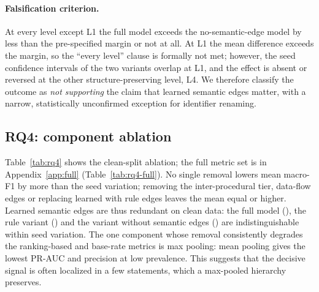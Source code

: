 \documentclass[pdflatex,sn-mathphys-num]{sn-jnl}
\begin{document}
\paragraph{Falsification criterion.} At every level except L1 the full model
exceeds the no-semantic-edge model by less than the pre-specified margin or not
at all. At L1 the mean difference exceeds the margin, so the ``every level''
clause is formally not met; however, the seed confidence intervals of the two
variants overlap at L1, and the effect is absent or reversed at the other
structure-preserving level, L4. We therefore classify the outcome as
\emph{not supporting} the claim that learned semantic edges matter, with a
narrow, statistically unconfirmed exception for identifier renaming.

\subsection{RQ4: component ablation}\label{sec:r-rq4}
Table~\ref{tab:rq4} shows the clean-split ablation; the full metric set is in
Appendix~\ref{app:full} (Table~\ref{tab:rq4-full}). No single removal lowers
mean macro-F1 by more than the seed variation; removing the inter-procedural
tier, data-flow edges or replacing learned with rule edges leaves the mean
equal or higher. Learned semantic edges are thus redundant on clean data: the
full model (\RqFourFullTestFOneMacro), the rule variant
(\RqFourRuleESemTestFOneMacro) and the variant without semantic edges
(\RqFourNoESemTestFOneMacro) are indistinguishable within seed variation. The
one component whose removal consistently degrades the ranking-based and
base-rate metrics is max pooling: mean pooling gives the lowest PR-AUC and
precision at low prevalence. This suggests that the decisive signal is often
localized in a few statements, which a max-pooled hierarchy preserves.
\end{document}
